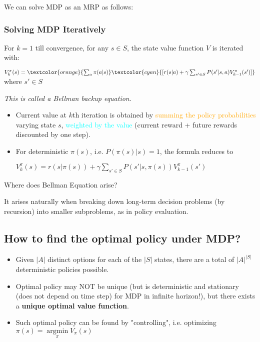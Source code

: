 \documentclass{article}
\begin{document}
We can solve MDP as an MRP as follows:
\begin{prfbox}
    \subsubsection*{Solving MDP Iteratively}
    For $k = 1$ till convergence, for any $s \in S$, the state value function $V$ is iterated with:
    \begin{center}
        $V_k^{\pi}(s) = \textcolor{orange}{\sum_{a} \pi(a | s)} \textcolor{cyan}{[r (s | a) + \gamma \sum_{s' \in S} P(s' | s,a) V_{k-1}^\pi(s')]}$ 
        \quad\quad where $s' \in S$
    \end{center}
    \textit{This is called a Bellman backup equation.}
    \begin{itemize}
    \item Current value at $k$th iteration is obtained by 
            \textcolor{orange}{summing the policy probabilities} varying state $s$, 
            \textcolor{cyan}{weighted by the value} (current reward + future rewards discounted by one step).
    \item For deterministic $\pi(s)$, i.e. $P(\pi(s) | s) = 1$, the formula reduces to
    \begin{center}
        $V_k^{\pi}(s) = r (s | \pi(s)) + \gamma \sum_{s' \in S} P(s' | s, \pi(s)) V_{k-1}^\pi(s')$
    \end{center}
    \end{itemize}
\end{prfbox}
\begin{hintbox}
    Where does Bellman Equation arise?
    \begin{prfbox}
        It arises naturally when breaking down long-term decision problems (by recursion) into smaller subproblems, as in policy evaluation.
    \end{prfbox}
\end{hintbox}

\subsection{How to find the optimal policy under MDP?}
\begin{itemize}
\item Given $|A|$ distinct options for each of the $|S|$ states, there are a total of $|A|^{|S|}$ deterministic policies possible.
\item Optimal policy may NOT be unique (but is deterministic and stationary (does not depend on time step) for MDP in infinite horizon!), but there exists a \textbf{unique optimal value function}.
\item Such optimal policy can be found by "controlling", i.e. optimizing $\pi(s) = \mathop{\arg\min}\limits_{\pi} V_{\pi}(s)$
\end{itemize}
\end{document}
